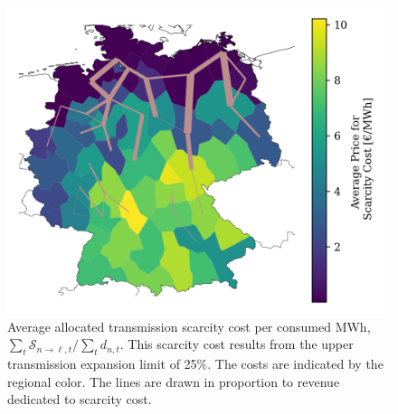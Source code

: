 \documentclass[11pt,twocolumn]{article}
\newcommand{\demand}[1][n]{d_{#1,t}}
\newcommand{\scarcitycost}{\mathcal{S}}
\begin{document}
\begin{figure}
    \includegraphics[width=\linewidth]{de50/maps_scarcity_price/branch_scarcity_cost_total}
    \caption{Average allocated transmission scarcity cost per consumed MWh, $\sum_t \scarcitycost_{n \rightarrow \ell, t} / \sum_t \demand $. This scarcity cost results from the upper transmission expansion limit of 25\%. The costs are indicated by the regional color.  The lines are drawn in proportion to revenue dedicated to scarcity cost. }
    \label{fig:branch_scarcity_price}
\end{figure}
\end{document}
